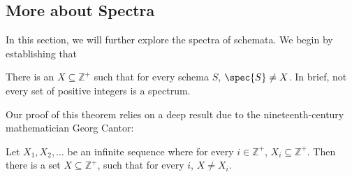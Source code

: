 \subsection{More about Spectra}

In this section, we will further explore the spectra of schemata. We begin by establishing that
\begin{theorem}\label{there-are-non-spectra-thm}
There is an $X\subseteq\mathbb{Z}^+$ such that for every schema $S$, $\spec{S}\neq X$. In brief, not every set of positive integers is a spectrum.
\end{theorem}
Our proof of this 
theorem relies on a deep result due to the nineteenth-century mathematician Georg Cantor:
\begin{theorem}\label{cantor-diagonal-thm}
Let $X_1,X_2,\ldots$ be an infinite sequence where for every $i\in\mathbb{Z}^+$, $X_i\subseteq\mathbb{Z}^+$. Then there is a set $X\subseteq\mathbb{Z}^+$, such that for every $i$, $X\neq X_i$. 
\end{theorem}
